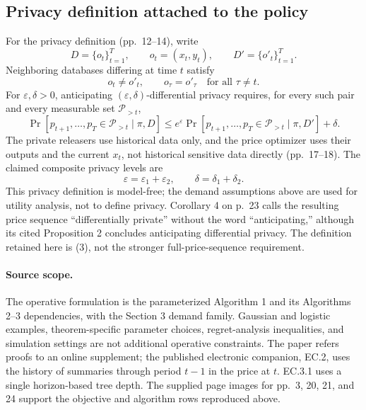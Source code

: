 \documentclass{article}
\begin{document}
\subsection*{Privacy definition attached to the policy}
For the privacy definition (pp.~12--14), write
\[
D=\{o_t\}_{t=1}^{T},\qquad o_t=(x_t,y_t),
\qquad D'=\{o'_t\}_{t=1}^{T}.
\]
Neighboring databases differing at time $t$ satisfy
\[
o_t\ne o'_t,\qquad o_\tau=o'_\tau\quad\text{for all }\tau\ne t.
\]
For $\varepsilon,\delta>0$, anticipating $(\varepsilon,\delta)$-differential privacy requires, for every such pair and every measurable set $\mathcal P_{>t}$,
\begin{equation}
\Pr[p_{t+1},\ldots,p_T\in\mathcal P_{>t}\mid\pi,D]
\le e^{\varepsilon}
\Pr[p_{t+1},\ldots,p_T\in\mathcal P_{>t}\mid\pi,D']+\delta.
\tag{3}
\end{equation}
The private releasers use historical data only, and the price optimizer uses their outputs and the current $x_t$, not historical sensitive data directly (pp.~17--18). The claimed composite privacy levels are
\[
\varepsilon=\varepsilon_1+\varepsilon_2,
\qquad \delta=\delta_1+\delta_2.
\]
This privacy definition is model-free; the demand assumptions above are used for utility analysis, not to define privacy. Corollary 4 on p.~23 calls the resulting price sequence ``differentially private'' without the word ``anticipating,'' although its cited Proposition 2 concludes anticipating differential privacy. The definition retained here is (3), not the stronger full-price-sequence requirement.

\paragraph{Source scope.}
The operative formulation is the parameterized Algorithm 1 and its Algorithms 2--3 dependencies, with the Section 3 demand family. Gaussian and logistic examples, theorem-specific parameter choices, regret-analysis inequalities, and simulation settings are not additional operative constraints. The paper refers proofs to an online supplement; the published electronic companion, EC.2, uses the history of summaries through period $t-1$ in the price at $t$. EC.3.1 uses a single horizon-based tree depth. The supplied page images for pp.~3, 20, 21, and 24 support the objective and algorithm rows reproduced above.
\end{document}
